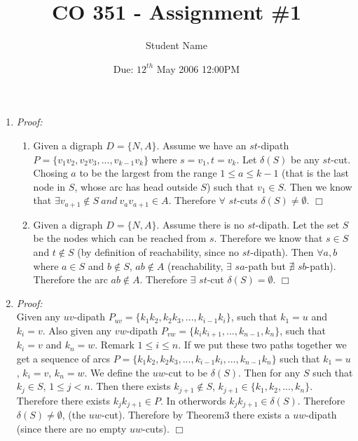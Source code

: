 \documentclass[a4paper,12pt]{article}
\begin{document}
\title{CO 351 - Assignment \#1}
\author{Student Name}
\date{Due: $12^{th}$ May 2006 12:00PM}

\maketitle

\begin{enumerate}
\item
\emph{Proof:}
\begin{enumerate}
\item
Given a digraph $D=\{N,A\}$. Assume we have an $st$-dipath $P = \{v_1v_2, v_2v_3, ... , v_{k-1}v_k\}$ where $s=v_1, t=v_k$. Let $\delta(S)$ be any $st$-cut. Chosing $a$ to be the largest from the range $1 \le a \le k-1$ (that is the last node in $S$, whose arc has head outside $S$) such that $v_1 \in S$. Then we know that $\exists v_{a+1} \notin S \ and \ v_av_{a+1} \in A$. Therefore $\forall$ $st$-cuts $\delta(S) \not= \emptyset$. $\Box$ 
\item
Given a digraph $D=\{N,A\}$. Assume there is no $st$-dipath. Let the set $S$ be the nodes which can be reached from $s$. Therefore we know that $s \in S$ and $t \notin S$ (by definition of reachability, since no $st$-dipath). Then $\forall a,b$ where $a \in S$ and $b \notin S$, $ab \notin A$ (reachability, $\exists$ $sa$-path but $\nexists$ $sb$-path). Therefore the arc $ab \notin A$. Therefore $\exists$ $st$-cut $\delta(S) = \emptyset$. $\Box$ 
\end{enumerate}


\item
\emph{Proof:} \\
Given any $uv$-dipath $P_{uv} = \{k_1k_2, k_2k_3, ..., k_{i-1}k_i\}$, such that $k_1 = u$ and $k_i = v$. Also given any $vw$-dipath $P_{vw} = \{k_ik_{i+1}, ..., k_{n-1}, k_n\}$, such that $k_i = v$ and $k_n = w$. Remark $1 \le i \le n$. If we put these two paths together we get a sequence of arcs $P = \{k_1k_2, k_2k_3, ..., k_{i-1}k_i, ..., k_{n-1}k_n\}$ such that $k_1 = u$, $k_i = v$, $k_n = w$. We define the $uw$-cut to be $\delta(S)$. Then for any $S$ such that $k_j \in S$, $1 \le j < n$. Then there exists $k_{j+1} \notin S$, $k_{j+1} \in \{k_1, k_2, ..., k_n\}$. Therefore there exists $k_jk_{j+1} \in P$. In otherwords $k_jk_{j+1} \in \delta(S)$. Therefore $\delta(S) \not= \emptyset$, (the $uw$-cut). Therefore by Theorem3 there exists a $uw$-dipath (since there are no empty $uw$-cuts). $\Box$


\end{enumerate}
\end{document}
